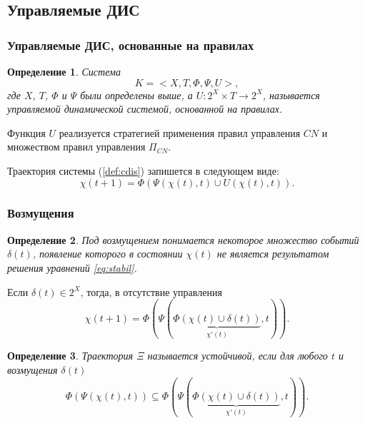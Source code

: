 \documentclass[default]{beamer}
\newtheorem{Def}{Определение}
\begin{document}
	\subsection{Управляемые ДИС}

	\begin{frame}
		\frametitle{Управляемые ДИС, основанные на правилах}
		
		\begin{Def}
			Система
			\begin{equation}\label{def:cdis}
				K=<X,T,\Phi,\Psi,U>,
			\end{equation}
			где $X$, $T$, $\Phi$ и $\Psi$ были определены выше, а $U: 2^X\times T \rightarrow 2^X$, называется управляемой динамической системой, основанной на правилах. 
		\end{Def}
		
		Функция $U$ реализуется стратегией применения правил управления $CN$ и множеством правил управления $\Pi_{CN}$.
		
		Траектория системы (\ref{def:cdis}) запишется в следующем виде:
		\begin{equation}\label{eq:control}
			\chi(t+1)=\Phi(\Psi(\chi(t),t)\cup U(\chi(t),t)).
		\end{equation}
	\end{frame}

	\begin{frame}
		\frametitle{Возмущения}
		
		\begin{Def}
			Под возмущением понимается некоторое множество событий $\delta(t)$, появление которого в состоянии $\chi(t)$ не является результатом решения уравнений \ref{eq:stabil}.
		\end{Def}
		Если $\delta(t)\in 2^X $, тогда, в отсутствие управления
		\begin{equation}
			\chi(t+1) =\Phi(\Psi(\underbrace{\Phi(\chi(t)\cup\delta(t))}_{\chi'(t)},t)).
		\end{equation}
		\begin{Def}
			Траектория $\Xi$ называется устойчивой, если для любого $t$ и возмущения $\delta(t)$ 
			\begin{equation}
				\Phi(\Psi(\chi(t),t))\subseteq\Phi(\Psi(\underbrace{\Phi(\chi(t)\cup\delta(t))}_{\chi'(t)},t)).
			\end{equation}
		\end{Def}
		
	\end{frame}
\end{document}
